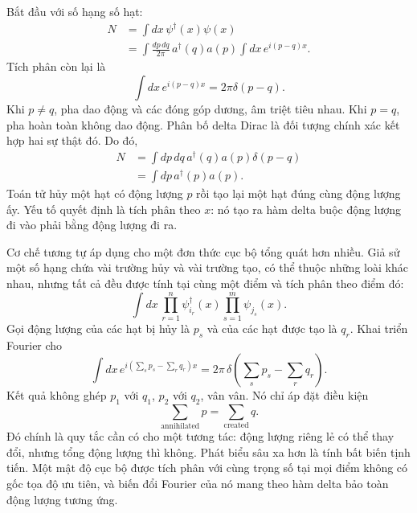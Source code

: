 Bắt đầu với số hạng số hạt:
\begin{align}
N
&=\int dx\,\psi^\dagger(x)\psi(x)\\
&=\int\frac{dp\,dq}{2\pi}\,
a^\dagger(q)a(p)
\int dx\,e^{i(p-q)x}.
\end{align}
Tích phân còn lại là
\begin{equation}
\int dx\,e^{i(p-q)x}=2\pi\delta(p-q).
\end{equation}
Khi \(p\ne q\), pha dao động và các đóng góp dương, âm triệt tiêu nhau. Khi \(p=q\), pha hoàn toàn không dao động. Phân bố delta Dirac là đối tượng chính xác kết hợp hai sự thật đó. Do đó,
\begin{align}
N
&=\int dp\,dq\,a^\dagger(q)a(p)\delta(p-q)\\
&=\int dp\,a^\dagger(p)a(p).
\label{eq:l9-number-momentum}
\end{align}
Toán tử hủy một hạt có động lượng \(p\) rồi tạo lại một hạt đúng cùng động lượng ấy. Yếu tố quyết định là tích phân theo \(x\): nó tạo ra hàm delta buộc động lượng đi vào phải bằng động lượng đi ra.

\begin{classroomqa}\end{classroomqa}

Cơ chế tương tự áp dụng cho một đơn thức cục bộ tổng quát hơn nhiều. Giả sử một số hạng chứa vài trường hủy và vài trường tạo, có thể thuộc những loài khác nhau, nhưng tất cả đều được tính tại cùng một điểm và tích phân theo điểm đó:
\begin{equation}
\int dx\,
\prod_{r=1}^{n} \psi_{i_r}^\dagger(x)
\prod_{s=1}^{m} \psi_{j_s}(x).
\end{equation}
Gọi động lượng của các hạt bị hủy là \(p_s\) và của các hạt được tạo là \(q_r\). Khai triển Fourier cho
\begin{equation}
\int dx\,
e^{i(\sum_s p_s-\sum_r q_r)x}
=2\pi\,
\delta\!\left(\sum_s p_s-\sum_r q_r\right).
\label{eq:l9-total-momentum-delta}
\end{equation}
Kết quả không ghép \(p_1\) với \(q_1\), \(p_2\) với \(q_2\), vân vân. Nó chỉ áp đặt điều kiện
\begin{equation}
\sum_{\mathrm{annihilated}}p
=
\sum_{\mathrm{created}}q.
\end{equation}
Đó chính là quy tắc cần có cho một tương tác: động lượng riêng lẻ có thể thay đổi, nhưng tổng động lượng thì không. Phát biểu sâu xa hơn là tính bất biến tịnh tiến. Một mật độ cục bộ được tích phân với cùng trọng số tại mọi điểm không có gốc tọa độ ưu tiên, và biến đổi Fourier của nó mang theo hàm delta bảo toàn động lượng tương ứng.

